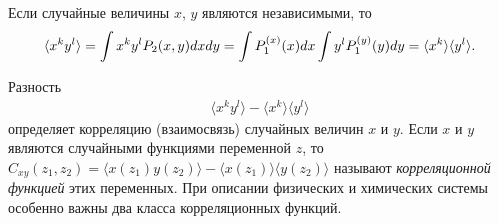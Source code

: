 \documentclass[14pt]{extarticle}
\begin{document}
Если случайные величины $x$, $y$ являются независимыми, то 
\begin{gather}
	\langle x^k y^l \rangle = \int x^k y^l P_2(x,y) dx dy = \int P_1^{(x)}(x) dx \int y^l P_1^{(y)}(y)  dy = \langle x^k \rangle \langle y^l \rangle. \notag
\end{gather}

Разность
\begin{gather}
	\langle x^k y^l \rangle - \langle x^k \rangle \langle y^l \rangle \label{1.193}
\end{gather}
определяет корреляцию (взаимосвязь) случайных величин $x$ и $y$. Если $x$ и $y$ являются случайными функциями переменной $z$, то $C_{xy}(z_1, z_2) = \langle x(z_1) y(z_2) \rangle - \langle x(z_1) \rangle \langle y(z_2) \rangle$ называют \textit{корреляционной функцией} этих переменных. При описании физических и химических системы особенно важны два класса корреляционных функций.
\end{document}
